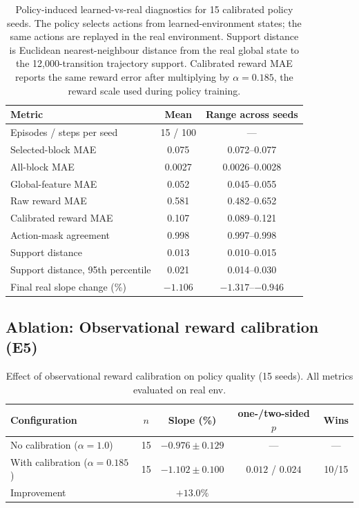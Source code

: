 \documentclass[11pt]{article}
\begin{document}
\begin{table}[htbp]
\centering
\scriptsize
\setlength{\tabcolsep}{4pt}
\caption{Policy-induced learned-vs-real diagnostics for 15 calibrated policy seeds. The policy selects actions from learned-environment states; the same actions are replayed in the real environment. Support distance is Euclidean nearest-neighbour distance from the real global state to the 12{,}000-transition trajectory support. Calibrated reward MAE reports the same reward error after multiplying by $\alpha=0.185$, the reward scale used during policy training.}
\label{tab:policy_induced_diag}
\begin{tabular}{lcc}
\toprule
Metric & Mean & Range across seeds \\
\midrule
Episodes / steps per seed & 15 / 100 & --- \\
Selected-block MAE & 0.075 & 0.072--0.077 \\
All-block MAE & 0.0027 & 0.0026--0.0028 \\
Global-feature MAE & 0.052 & 0.045--0.055 \\
Raw reward MAE & 0.581 & 0.482--0.652 \\
Calibrated reward MAE & 0.107 & 0.089--0.121 \\
Action-mask agreement & 0.998 & 0.997--0.998 \\
Support distance & 0.013 & 0.010--0.015 \\
Support distance, 95th percentile & 0.021 & 0.014--0.030 \\
Final real slope change (\%) & $-1.106$ & $-1.317$--$-0.946$ \\
\bottomrule
\end{tabular}
\end{table}

\subsection{Ablation: Observational reward calibration (E5)}

\begin{table}[htbp]
\centering
\caption{Effect of observational reward calibration on policy quality (15 seeds). All metrics evaluated on real env.}
\label{tab:e5}
\begin{tabular}{lcccc}
\toprule
Configuration & $n$ & Slope (\%) & one-/two-sided $p$ & Wins \\
\midrule
No calibration ($\alpha = 1.0$)       & 15 & $-0.976 \pm 0.129$ & --- & --- \\
With calibration ($\alpha = 0.185$)   & 15 & $\mathbf{-1.102 \pm 0.100}$ & $0.012$ / $0.024$ & 10/15 \\
\midrule
Improvement & & $+13.0\%$ & & \\
\bottomrule
\end{tabular}
\end{table}
\end{document}
